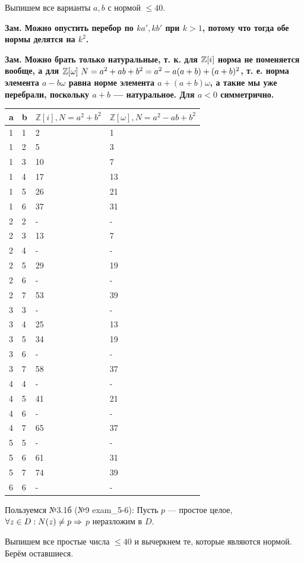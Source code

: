 \begin{solution}

Выпишем все варианты \(a, b\) с нормой \(\le 40\).

\bf{Зам.} Можно опустить перебор по \(ka', kb'\) при \(k > 1\), потому что тогда обе нормы делятся на \(k^2\).

\bf{Зам.} Можно брать только натуральные, т. к. для $\mathbb{Z}[i]$ норма не поменяется вообще, а для $\mathbb{Z}[\omega] \ N =  a^2 + ab + b^2 = a^2 - a (a+b) + (a+b)^2$, т. е. норма элемента $a - b \omega$ равна норме элемента $a + (a+b) \omega$, а такие мы уже перебрали, поскольку $a+b$ --- натуральное. Для $a <0$ симметрично.

\begin{longtable}[]{@{}llll@{}}
\toprule
a & b & \(\mathbb{Z}[i], N = a^2+b^2\) & \(\mathbb{Z}[\omega], N = a^2-ab+b^2\)\tabularnewline
\midrule
\endhead
1 & 1 & 2 & 1\tabularnewline
1 & 2 & 5 & 3\tabularnewline
1 & 3 & 10 & 7\tabularnewline
1 & 4 & 17 & 13\tabularnewline
1 & 5 & 26 & 21\tabularnewline
1 & 6 & 37 & 31\tabularnewline
2 & 2 & - & -\tabularnewline
2 & 3 & 13 & 7\tabularnewline
2 & 4 & - & -\tabularnewline
2 & 5 & 29 & 19\tabularnewline
2 & 6 & - & -\tabularnewline
2 & 7 & 53 & 39\tabularnewline
3 & 3 & - & -\tabularnewline
3 & 4 & 25 & 13\tabularnewline
3 & 5 & 34 & 19\tabularnewline
3 & 6 & - & -\tabularnewline
3 & 7 & 58 & 37\tabularnewline
4 & 4 & - & -\tabularnewline
4 & 5 & 41 & 21\tabularnewline
4 & 6 & - & -\tabularnewline
4 & 7 & 65 & 37\tabularnewline
5 & 5 & - & -\tabularnewline
5 & 6 & 61 & 31\tabularnewline
5 & 7 & 74 & 39\tabularnewline
6 & 6 & - & -\tabularnewline
\bottomrule
\end{longtable}

Пользуемся №3.1б (№9 exam\_5-6): Пусть $p$ --- простое целое, \(\forall z \in D: N(z)\ne p \Rightarrow\) $p$ неразложим в $D$.

Выпишем все простые числа \(\le 40\) и вычеркнем те, которые являются нормой. Берём оставшиеся.


\end{solution}
